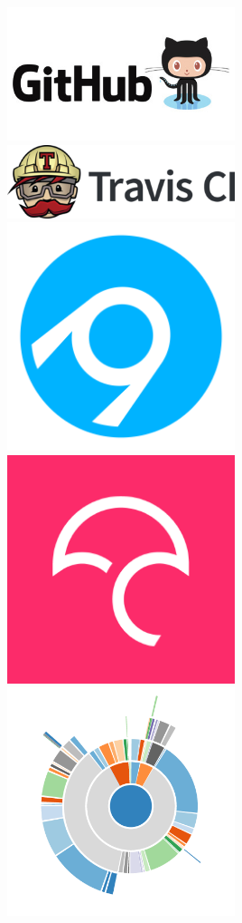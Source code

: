 \documentclass[trans]{beamer}
\begin{document}
{  \begin{minipage}{1\textwidth}
  \begin{columns}
  \includegraphics[width=0.5\textwidth]{figures/github-logo.jpg}
  \includegraphics[width=0.5\textwidth]{figures/travisci-logo.png}
  \includegraphics[width=0.5\textwidth]{figures/appveyor-logo-256.png}
  \includegraphics[width=0.5\textwidth]{figures/codecov-logo.png}
  \includegraphics[width=0.5\textwidth]{figures/quantifiedcode-logo.png}

\end{columns}
\end{minipage}}
\end{document}
